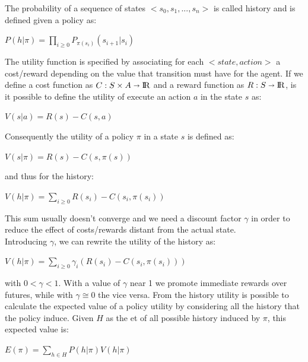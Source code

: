 \documentclass[pdftex,12pt,a4paper]{report}
\begin{document}
\noindent The probability of a sequence of states $<s_0, s_1, ... , s_n>$ is called history and is defined given a policy as:

\begin{center}
\noindent $P(h | \pi) = \prod\limits_{i \geqslant 0} P_{\pi(s_i)}(s_{i+1}|s_i)$
\end{center}

\noindent The utility function is specified by associating for each $<state, action>$ a cost/reward depending on the value that transition must have for the agent. If we define a cost function as $C : S \times A \shortrightarrow {\rm I\!R}$ and a reward function as $R : S\shortrightarrow {\rm I\!R}$, is it possible to define the utility of execute an action $a$ in the state $s$ as:
\begin{center}
\noindent $V(s|a) = R(s) - C(s,a)$
\end{center}

\noindent Consequently the utility of a policy $\pi$ in a state $s$ is defined as:
\begin{center}
\noindent $V(s|\pi) = R(s) - C(s,\pi(s))$
\end{center}

\noindent and thus for the history:
\begin{center}
\noindent $V(h|\pi) = \sum\limits_{i \geqslant 0} R(s_i) - C(s_i,\pi(s_i))$
\end{center}

\noindent This sum usually doesn't converge and we need a discount factor $\gamma$ in order to reduce the effect of costs/rewards distant from the actual state.
\\\noindent Introducing $\gamma$, we can rewrite the utility of the history as:
\begin{center}
\noindent $V(h|\pi) = \sum\limits_{i \geqslant 0} \gamma_i (R(s_i) - C(s_i,\pi(s_i)))$
\end{center}

\noindent with $0 < \gamma < 1$. With a value of $\gamma$ near 1 we promote immediate rewards over futures, while with $\gamma \cong 0$ the vice versa.
\noindent From the history utility is possible to calculate the expected value of a policy utility by considering all the history that the policy induce.
Given $H$ as the et of all possible history induced by $\pi$, this expected value is:
\begin{center}
\noindent $E(\pi) = \sum_{h \in H} P(h|\pi)V(h|\pi)$
\end{center}
\end{document}
